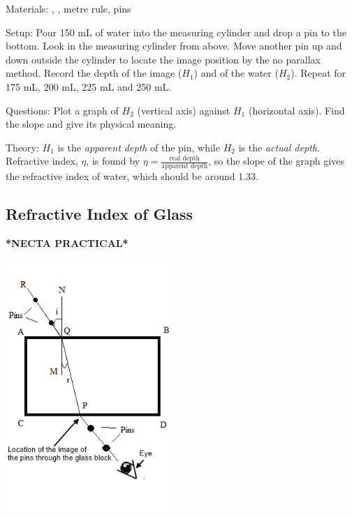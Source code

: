 \begin{multicols}{2}
\begin{description*}
\item[Materials:]{, , metre rule, pins}
\item[Setup:]{Pour 150 mL of water into the measuring cylinder and drop a pin to the bottom. Look in the measuring cylinder from above. Move another pin up and down outside the cylinder to locate the image position by the no parallax method. Record the depth of the image ($H_1$) and of the water ($H_2$). Repeat for 175 mL, 200 mL, 225 mL and 250 mL.}
\item[Questions:]{Plot a graph of $H_2$ (vertical axis) against $H_1$ (horizontal axis). Find the slope and give its physical meaning.}
\item[Theory:]{$H_1$ is the \emph{apparent depth} of the pin, while $H_2$ is the \emph{actual depth}. Refractive index, $\eta$, is found by $\eta = \frac{\text{real depth}}{\text{apparent depth}}$, so the slope of the graph gives the refractive index of water, which should be around 1.33.}
\end{description*}

\subsection{Refractive Index of Glass} \label{sub:refr-index-glass}  
\textbf{*NECTA PRACTICAL*}

\begin{center}
\includegraphics[width=0.49\textwidth]{./img/refractive-index-1.png}
\end{center}


\end{multicols}
